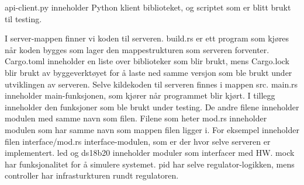 api-client.py inneholder Python klient biblioteket, og scriptet som er blitt brukt til testing.

I server-mappen finner vi koden til serveren. build.rs er ett program som kjøres når koden bygges som lager den mappestrukturen som serveren forventer. Cargo.toml inneholder en liste over biblioteker som blir brukt, mens Cargo.lock blir brukt av byggeverktøyet for å laste ned samme versjon som ble brukt under utviklingen av serveren. Selve kildekoden til serveren finnes i mappen src. main.rs inneholder main-funksjonen, som kjører når programmet blir kjørt. I tillegg inneholder den funksjoner som ble brukt under testing. De andre filene inneholder modulen med samme navn som filen. Filene som heter mod.rs inneholder modulen som har samme navn som mappen filen ligger i. For eksempel inneholder filen interface/mod.rs interface-modulen, som er der hvor selve serveren er implementert. led og ds18b20 inneholder moduler som interfacer med HW. mock har funksjonalitet for å simulere systemet. pid har selve regulator-logikken, mens controller har infrasturkturen rundt regulatoren.